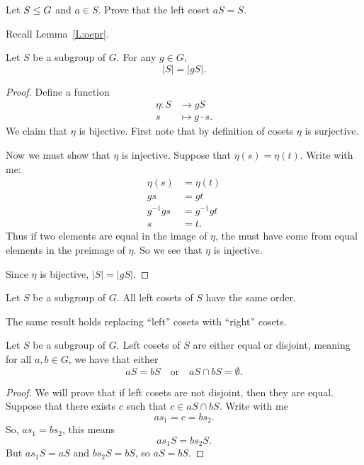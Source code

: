 \documentclass{ximera}
\begin{document}
\begin{exercise}
  Let $S\leq G$ and $a\in S$. Prove that the left coset $aS = S$.
  \begin{hint}
    Recall Lemma~\ref{L:oepr}.
  \end{hint}
\end{exercise}





\begin{lemma}\label{L:CSG}
  Let $S$ be a subgroup of $G$. For any $g\in G$,
  \[
  |S| = |gS|.
  \]
  \begin{proof}
    Define a function
    \begin{align*}
      \eta: S &\to g S\\
      s &\mapsto g\cdot s.
    \end{align*}
    We claim that $\eta$ is bijective. First note that by definition
    of cosets $\eta$ is surjective.

    Now we must show that $\eta$ is injective. Suppose that $\eta(s) =
    \eta(t)$. Write with me:
    \begin{align*}
      \eta(s) &= \eta(t) \\
      gs &= gt\\
      g^{-1} g s &= g^{-1} g t\\
      s &= t.
    \end{align*}
    Thus if two elements are equal in the image of $\eta$, the must
    have come from equal elements in the preimage of $\eta$. So we see
    that $\eta$ is injective.

    Since $\eta$ is bijective, $|S|= |gS|$.
  \end{proof}
\end{lemma}

\begin{corollary}
  Let $S$ be a subgroup of $G$. All left cosets of $S$ have the same
  order.
\end{corollary}

\begin{remark}
  The same result holds replacing ``left'' cosets with ``right''
  cosets.
\end{remark}



\begin{lemma}\label{L:cosetED}
  Let $S$ be a subgroup of $G$. Left cosets of $S$ are either equal or
  disjoint, meaning for all $a,b\in G$, we have that either
  \[
  aS = bS \quad\text{or}\quad aS \cap bS = \emptyset.
  \]
  \begin{proof}
    We will prove that if left cosets are not disjoint, then they are
    equal. Suppose that there exists $c$ such that $c\in aS \cap
    bS$. Write with me
    \[
    as_1 = c = bs_2.
    \]
    So, $as_1 = bs_2$, this means
    \[
    as_1 S = bs_2 S.
    \]
    But $as_1S = aS$ and $bs_2 S = bS$, so $aS = bS$.
  \end{proof}
\end{lemma}
\end{document}
